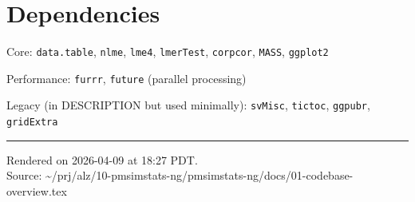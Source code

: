\documentclass[11pt]{article}
\begin{document}
\section{Dependencies}

Core: \texttt{data.table}, \texttt{nlme}, \texttt{lme4}, \texttt{lmerTest}, \texttt{corpcor},
\texttt{MASS}, \texttt{ggplot2}

Performance: \texttt{furrr}, \texttt{future} (parallel processing)

Legacy (in DESCRIPTION but used minimally): \texttt{svMisc},
\texttt{tictoc}, \texttt{ggpubr}, \texttt{gridExtra}

\vfill
\noindent\rule{\textwidth}{0.4pt}
{\footnotesize
Rendered on 2026-04-09 at 18:27 PDT.\\
Source: \textasciitilde/prj/alz/10-pmsimstats-ng/pmsimstats-ng/docs/01-codebase-overview.tex}
\end{document}
